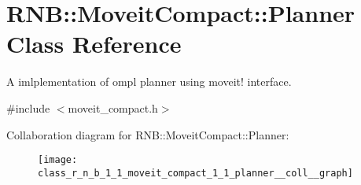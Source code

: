 \hypertarget{class_r_n_b_1_1_moveit_compact_1_1_planner}{}\section{R\+NB\+:\+:Moveit\+Compact\+:\+:Planner Class Reference}
\label{class_r_n_b_1_1_moveit_compact_1_1_planner}


A imlplementation of ompl planner using moveit! interface.  




{\ttfamily \#include $<$moveit\+\_\+compact.\+h$>$}



Collaboration diagram for R\+NB\+:\+:Moveit\+Compact\+:\+:Planner\+:\nopagebreak
\begin{figure}[H]
\begin{center}
\leavevmode
\texttt{[image: class\_r\_n\_b\_1\_1\_moveit\_compact\_1\_1\_planner\_\_coll\_\_graph]}
\end{center}
\end{figure}

